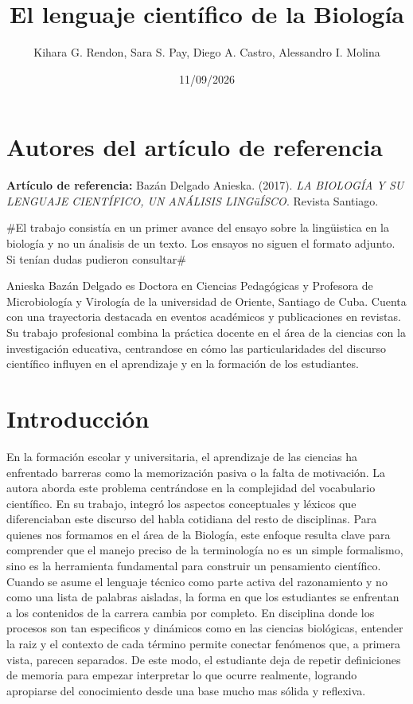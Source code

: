 \documentclass[12pt]{article}
\title{El lenguaje científico de la Biología}
\author{Kihara G. Rendon, Sara S. Pay, Diego A. Castro, Alessandro I. Molina}
\date{11/09/2026}
\begin{document}
\maketitle
\section{Autores del artículo de referencia}
\textbf{Artículo de referencia:} Bazán Delgado Anieska. (2017). \textit{LA BIOLOGÍA Y SU LENGUAJE CIENTÍFICO, UN ANÁLISIS LINGüÍSCO}. Revista Santiago.

#El trabajo consistía en un primer avance del ensayo sobre la lingüistica en la biología y no un ánalisis de un texto. Los ensayos no siguen el formato adjunto. Si tenían dudas pudieron consultar#

Anieska Bazán Delgado es Doctora en Ciencias Pedagógicas y Profesora de Microbiología y Virología de la universidad de Oriente, Santiago de Cuba. Cuenta con una trayectoria destacada en eventos académicos y publicaciones en revistas. Su trabajo profesional combina la práctica docente en el área de la ciencias con la investigación educativa, centrandose en cómo las particularidades del discurso científico influyen en el aprendizaje y en la formación de los estudiantes.

\section{Introducción}
En la formación escolar y universitaria, el aprendizaje de las ciencias ha enfrentado barreras como la memorización pasiva o la falta de motivación. La autora aborda este problema centrándose en la complejidad del vocabulario científico. En su trabajo, integró los aspectos conceptuales y léxicos que diferenciaban este discurso del habla cotidiana del resto de disciplinas. Para quienes nos formamos en el área de la Biología, este enfoque resulta clave para comprender que el manejo preciso de la terminología no es un simple formalismo, sino es la herramienta fundamental para construir un pensamiento científico. Cuando se asume el lenguaje técnico como parte activa del razonamiento y no como una lista de palabras aisladas, la forma en que los estudiantes se enfrentan a los contenidos de la carrera cambia por completo. En disciplina donde los procesos son tan especificos y dinámicos como en las ciencias biológicas, entender la raiz y el contexto de cada término permite conectar fenómenos que, a primera vista, parecen separados. De este modo, el estudiante deja de repetir definiciones de memoria para empezar interpretar lo que ocurre realmente, logrando apropiarse del conocimiento desde una base mucho mas sólida y reflexiva.
\end{document}
